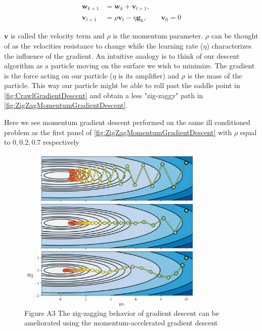 \documentclass{article}
\theoremstyle{definition}
\begin{document}
\begin{equation}
\begin{aligned} 
    \mathbf{w}_{k+1} &= \mathbf{w}_k + \mathbf{v}_{t+1}, \\
    \mathbf{v}_{t+1} &= \rho \mathbf{v}_t - \eta \mathbf{g}_k, \qquad \mathbf{v}_0 = 0 
\end{aligned}
\label{eq:momentum_eq}
\end{equation}


$\mathbf{v}$ is called the velocity term and $\rho$ is the momentum parameter. $\rho$ can be thought of as the velocities resistance to change while the learning rate ($\eta$) characterizes the influence of the gradient. An intuitive analogy is to think of our descent algorithm as a particle moving on the surface we wish to minimize. The gradient is the force acting on our particle ($\eta$ is its amplifier) and $\rho$ is the mass of the particle. This way our particle might be able to roll past the saddle point in \autoref{fig:CrawlGradientDescent} and obtain a less "zig-zaggy" path in \autoref{fig:ZigZagMomentumGradientDescent}.

Here we see momentum gradient descent performed on the same ill conditioned problem as the first panel of \autoref{fig:ZigZagMomentumGradientDescent} with $\rho$ equal to $0, 0.2, 0.7$ respectively

\begin{figure}[H]
    \centering
    \includegraphics[width=0.8\textwidth]{Project2/figures/momentum_based_gradient_descent_less_zig.jpg.jpg}
    \caption{Figure A3 \parencite[p.~478]{MLRefined} The zig-zagging behavior of gradient
descent can be ameliorated using the momentum-accelerated gradient descent}
    \label{fig:ZigZagMomentumGradientDescent}
\end{figure}
\end{document}
